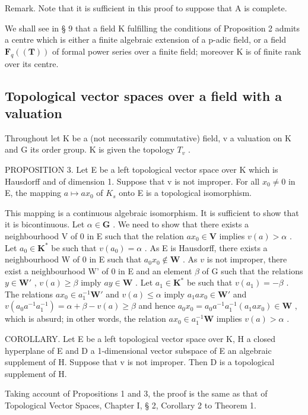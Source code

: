 Remark. Note that it is sufficient in this proof to suppose that A is complete.

We shall see in § 9 that a field K fulfilling the conditions of Proposition 2 admits a centre which is either a finite algebraic extension of a p-adic field, or a field \(\mathbf{F}_{q}((\mathbf{T}))\) of formal power series over a finite field; moreover K is of finite rank over its centre.

\subsection{Topological vector spaces over a field with a valuation}

Throughout let K be a (not necessarily commutative) field, v a valuation on K and G its order group. K is given the topology \(T_{v}\) .

PROPOSITION 3. Let E be a left topological vector space over K which is Hausdorff and of dimension 1. Suppose that v is not improper. For all \(x_{0} \neq 0\) in E, the mapping \(a \mapsto ax_{0}\) of \(K_{s}\) onto E is a topological isomorphism.

This mapping is a continuous algebraic isomorphism. It is sufficient to show that it is bicontinuous. Let \(\alpha \in \mathbf{G}\) . We need to show that there exists a neighbourhood V of 0 in E such that the relation \(ax_0 \in \mathbf{V}\) implies \(v(a) > \alpha\) . Let \(a_0 \in \mathbf{K}^*\) be such that \(v(a_0) = \alpha\) . As E is Hausdorff, there exists a neighbourhood W of 0 in E such that \(a_0 x_0 \notin \mathbf{W}\) . As \(v\) is not improper, there exist a neighbourhood W' of 0 in E and an element \(\beta\) of G such that the relations \(y \in \mathbf{W}'\) , \(v(a) \geqslant \beta\) imply \(ay \in \mathbf{W}\) . Let \(a_1 \in \mathbf{K}^*\) be such that \(v(a_1) = -\beta\) . The relations \(ax_0 \in a_1^{-1} \mathbf{W}'\) and \(v(a) \leqslant \alpha\) imply \(a_1 ax_0 \in \mathbf{W}'\) and \(v(a_0 a^{-1} a_1^{-1}) = \alpha + \beta - v(a) \geqslant \beta\) and hence \(a_0 x_0 = a_0 a^{-1} a_1^{-1}(a_1 ax_0) \in \mathbf{W}\) , which is absurd; in other words, the relation \(ax_0 \in a_1^{-1} \mathbf{W}\) implies \(v(a) > \alpha\) .

COROLLARY. Let E be a left topological vector space over K, H a closed hyperplane of E and D a 1-dimensional vector subspace of E an algebraic supplement of H. Suppose that v is not improper. Then D is a topological supplement of H.

Taking account of Propositions 1 and 3, the proof is the same as that of Topological Vector Spaces, Chapter I, § 2, Corollary 2 to Theorem 1.

